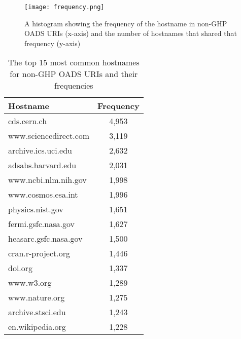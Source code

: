 \begin{figure}
    \centering
    \texttt{[image: frequency.png]}
    \caption{A histogram showing the frequency of the hostname in non-GHP OADS URIs (x-axis) and the number of hostnames that shared that frequency (y-axis)}
    \label{fig:frequency}
\end{figure}

\begin{table}
    \centering
    \begin{tabular}{|l|c|}
    \hline
    Hostname & Frequency \\
    \hline
    cds.cern.ch & 4,953 \\
    www.sciencedirect.com & 3,119 \\
    archive.ics.uci.edu & 2,632 \\
    adsabs.harvard.edu & 2,031 \\
    www.ncbi.nlm.nih.gov & 1,998 \\
    www.cosmos.esa.int & 1,996 \\
    physics.nist.gov & 1,651 \\
    fermi.gsfc.nasa.gov & 1,627 \\
    heasarc.gsfc.nasa.gov & 1,500 \\
    cran.r-project.org & 1,446 \\
    doi.org & 1,337 \\
    www.w3.org & 1,289 \\
    www.nature.org & 1,275 \\
    archive.stsci.edu & 1,243 \\
    en.wikipedia.org & 1,228 \\
    \hline
    \end{tabular}
    \caption{The top 15 most common hostnames for non-GHP OADS URIs and their frequencies}
    \label{tab:hostnames}
\end{table}